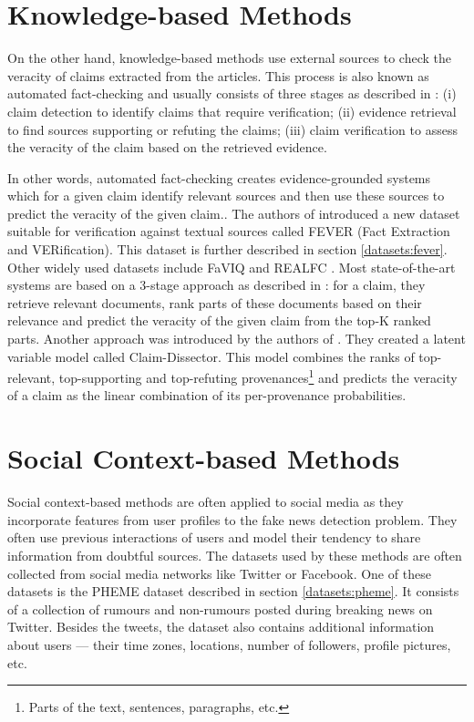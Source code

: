 \section{Knowledge-based Methods}
On the other hand, knowledge-based methods use external sources to check the veracity of claims extracted from the articles. This process is also known as automated fact-checking and usually consists of three stages as described in \cite{prev-work-fact-checking}: (i) claim detection to identify claims that require verification; (ii) evidence retrieval to find sources supporting or refuting the claims; (iii) claim verification to assess the veracity of the claim based on the retrieved evidence.

In other words, automated fact-checking creates evidence-grounded systems which for a given claim identify relevant sources and then use these sources to predict the veracity of the given claim.\cite{claim-dissector}.
The authors of \cite{fever} introduced a new dataset suitable for verification against textual sources called FEVER (Fact Extraction and VERification). This dataset is further described in section \ref{datasets:fever}. Other widely used datasets include FaVIQ \cite{faviq} and REALFC \cite{realfc}. Most state-of-the-art systems are based on a 3-stage approach as described in \cite{claim-dissector}: for a claim, they retrieve relevant documents, rank parts of these documents based on their relevance and predict the veracity of the given claim from the top-K ranked parts.
Another approach was introduced by the authors of \cite{claim-dissector}. They created a latent variable model called Claim-Dissector. This model combines the ranks of top-relevant, top-supporting and top-refuting provenances\footnote{Parts of the text, sentences, paragraphs, etc.} and predicts the veracity of a claim as the linear combination of its per-provenance probabilities.

\section{Social Context-based Methods}
Social context-based methods are often applied to social media as they incorporate features from user profiles to the fake news detection problem. They often use previous interactions of users and model their tendency to share information from doubtful sources. The datasets used by these methods are often collected from social media networks like Twitter or Facebook. One of these datasets is the PHEME dataset described in section \ref{datasets:pheme}. It consists of a collection of rumours and non-rumours posted during breaking news on Twitter. Besides the tweets, the dataset also contains additional information about users — their time zones, locations, number of followers, profile pictures, etc.

